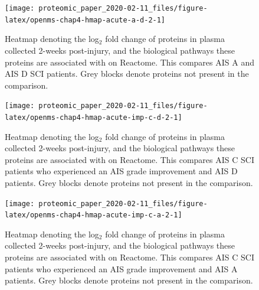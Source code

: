 \documentclass[9pt,lineno]{elife}
\begin{document}
\begin{landscape}



\begin{figure}

{\centering \texttt{[image: proteomic\_paper\_2020-02-11\_files/figure-latex/openms-chap4-hmap-acute-a-d-2-1]} 

}

\caption[Heatmap - label-free - Acute A VS Acute D]{Heatmap denoting the log\(_2\) fold change of proteins in plasma collected 2-weeks post-injury, and the biological pathways these proteins are associated with on Reactome. This compares AIS A and AIS D SCI patients. Grey blocks denote proteins not present in the comparison.}\label{fig:openms-chap4-hmap-acute-a-d-2}
\end{figure}

\end{landscape}
\begin{landscape}



\begin{figure}

{\centering \texttt{[image: proteomic\_paper\_2020-02-11\_files/figure-latex/openms-chap4-hmap-acute-imp-c-d-2-1]} 

}

\caption[Heatmap - label-free - Acute C Improvers VS Acute D]{Heatmap denoting the log\(_2\) fold change of proteins in plasma collected 2-weeks post-injury, and the biological pathways these proteins are associated with on Reactome. This compares AIS C SCI patients who experienced an AIS grade improvement and AIS D patients. Grey blocks denote proteins not present in the comparison.}\label{fig:openms-chap4-hmap-acute-imp-c-d-2}
\end{figure}

\end{landscape}
\begin{landscape}



\begin{figure}

{\centering \texttt{[image: proteomic\_paper\_2020-02-11\_files/figure-latex/openms-chap4-hmap-acute-imp-c-a-2-1]} 

}

\caption[Heatmap - label-free - Acute A VS Acute C Improvers]{Heatmap denoting the log\(_2\) fold change of proteins in plasma collected 2-weeks post-injury, and the biological pathways these proteins are associated with on Reactome. This compares AIS C SCI patients who experienced an AIS grade improvement and AIS A patients. Grey blocks denote proteins not present in the comparison.}\label{fig:openms-chap4-hmap-acute-imp-c-a-2}
\end{figure}

\end{landscape}
\end{document}
